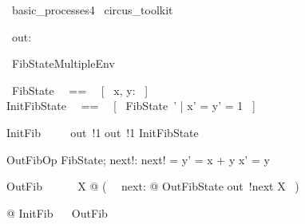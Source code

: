 
\begin{zsection}
  \SECTION\ basic\_processes4 \parents\ circus\_toolkit
\end{zsection}

\begin{circus}
    \circchannel\ out: \nat
\end{circus}

\begin{circus}
    \circprocess\ FibStateMultipleEnv ~~\circdef~~ \circbegin
\end{circus}

\begin{circusaction}
    \circstate\ FibState ~~==~~ [~ x, y: \nat ~] \\
    InitFibState ~~==~~ [~ FibState~' | x' = y' = 1 ~]
\end{circusaction}

\begin{circusaction}
    InitFib ~~\circdef~~ out~!1 \then out~!1 \then InitFibState
\end{circusaction}

\begin{schema}{OutFibOp}
    \Delta FibState; next!: \nat
\where
    next! = y' = x + y \land x' = y
\end{schema}

\begin{circusaction}
    OutFib ~~\circdef~~ \circmu\ X @ (~ \circvar\ next: \nat @ OutFibState \circseq out~!next \then X ~)
\end{circusaction}

\begin{circusaction}
    @ InitFib ~\circseq~ OutFib
\end{circusaction}

\begin{circus}
    \circend
\end{circus}

